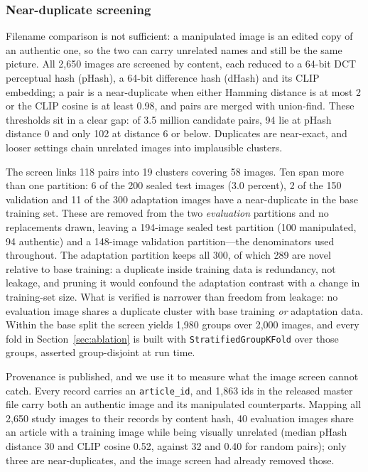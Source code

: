 \documentclass[conference,a4paper]{IEEEtran}
\begin{document}
\subsubsection{Near-duplicate screening}
\label{sec:dedup}
Filename comparison is not sufficient: a manipulated image is an edited copy
of an authentic one, so the two can carry unrelated names and still be the same
picture. All 2{,}650 images are screened by content, each reduced to a 64-bit
DCT perceptual hash (pHash), a 64-bit difference hash (dHash) and its CLIP
embedding; a pair is a near-duplicate when either Hamming distance is at most 2
or the CLIP cosine is at least 0.98, and pairs are merged with union-find.
These thresholds sit in a clear gap: of 3.5 million candidate pairs, 94 lie at
pHash distance 0 and only 102 at distance 6 or below. Duplicates are
near-exact, and looser settings chain unrelated images into implausible
clusters.

The screen links 118 pairs into 19 clusters covering 58 images. Ten span more
than one partition: 6 of the 200 sealed test images (3.0 percent), 2 of the 150
validation and 11 of the 300 adaptation images have a near-duplicate in the
base training set. These are removed from the two \emph{evaluation} partitions
and no replacements drawn, leaving a 194-image sealed test partition (100
manipulated, 94 authentic) and a 148-image validation partition---the
denominators used throughout.
The adaptation partition keeps all 300, of which 289 are novel relative to
base training: a duplicate inside training data is redundancy, not leakage, and
pruning it would confound the adaptation contrast with a change in training-set
size. What is verified is narrower than freedom from leakage: no evaluation
image shares a duplicate cluster with base training \emph{or} adaptation data. Within the base split
the screen yields 1{,}980 groups over 2{,}000 images, and every fold in
Section~\ref{sec:ablation} is built with \texttt{StratifiedGroupKFold} over
those groups, asserted group-disjoint at run time.

Provenance is published, and we use it to measure what the image screen cannot
catch. Every record carries an \texttt{article\_id}, and 1{,}863 ids in the
released master file carry both an authentic image and its manipulated
counterparts. Mapping all 2{,}650 study images to their records by content
hash, 40 evaluation images share an article with a training image while being
visually unrelated (median pHash distance 30 and CLIP cosine 0.52, against 32
and 0.40 for random pairs); only three are near-duplicates, and the image
screen had already removed those.
\end{document}
